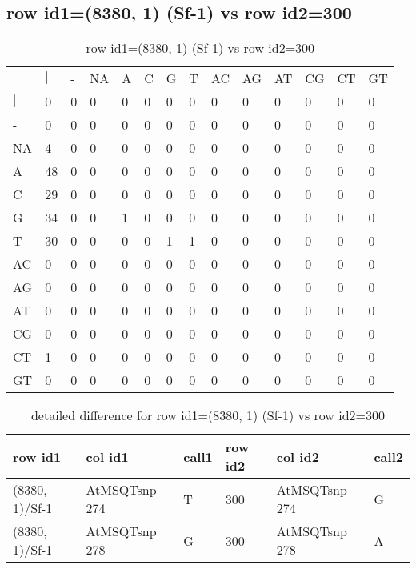 \subsection{row id1=(8380, 1) (Sf-1) vs row id2=300}
\begin{center}
\begin{longtable}{|l|l|l|l|l|l|l|l|l|l|l|l|l|l|}
\caption{row id1=(8380, 1) (Sf-1) vs row id2=300} \label{table_dm616}\\
\hline
\\
\hline
&$|$&-&NA&A&C&G&T&AC&AG&AT&CG&CT&GT\\
$|$&0&0&0&0&0&0&0&0&0&0&0&0&0\\
-&0&0&0&0&0&0&0&0&0&0&0&0&0\\
NA&4&0&0&0&0&0&0&0&0&0&0&0&0\\
A&48&0&0&0&0&0&0&0&0&0&0&0&0\\
C&29&0&0&0&0&0&0&0&0&0&0&0&0\\
G&34&0&0&1&0&0&0&0&0&0&0&0&0\\
T&30&0&0&0&0&1&1&0&0&0&0&0&0\\
AC&0&0&0&0&0&0&0&0&0&0&0&0&0\\
AG&0&0&0&0&0&0&0&0&0&0&0&0&0\\
AT&0&0&0&0&0&0&0&0&0&0&0&0&0\\
CG&0&0&0&0&0&0&0&0&0&0&0&0&0\\
CT&1&0&0&0&0&0&0&0&0&0&0&0&0\\
GT&0&0&0&0&0&0&0&0&0&0&0&0&0\\
\hline
\end{longtable}
\end{center}

\begin{center}
\begin{longtable}{|l|l|l|l|l|l|}
\caption{detailed difference for row id1=(8380, 1) (Sf-1) vs row id2=300} \label{table_dm617}\\
\hline
row id1&col id1&call1&row id2&col id2&call2\\
\hline
(8380, 1)/Sf-1&AtMSQTsnp 274&T&300&AtMSQTsnp 274&G\\
(8380, 1)/Sf-1&AtMSQTsnp 278&G&300&AtMSQTsnp 278&A\\
\hline
\end{longtable}
\end{center}

